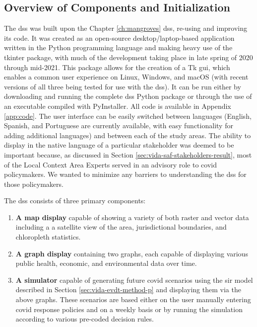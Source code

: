 \subsection{Overview of Components and Initialization}

The \ac{dss} was built upon the Chapter \ref{ch:mangroves} \ac{dss}, re-using and improving its code. It was created as an open-source desktop/laptop-based application written in the Python programming language and making heavy use of the tkinter package, with much of the development taking place in late spring of 2020 through mid-2021. This package allows for the creation of a Tk \ac{gui}, which enables a common user experience on Linux, Windows, and macOS (with recent versions of all three being tested for use with the \ac{dss}). It can be run either by downloading and running the complete \ac{dss} Python package or through the use of an executable compiled with PyInstaller. All code is available in Appendix \ref{app:code}. The user interface can be easily switched between languages (English, Spanish, and Portuguese are currently available, with easy functionality for adding additional languages) and between each of the study areas. The ability to display in the native language of a particular stakeholder was deemed to be important because, as discussed in Section \ref{sec:vida-saf-stakeholders-result}, most of the Local Context Area Experts served in an advisory role to \ac{covid} policymakers. We wanted to minimize any barriers to understanding the \ac{dss} for those policymakers.

The \ac{dss} consists of three primary components:

\begin{enumerate}[label=\emph{\alph*},itemsep=0pt,parsep=0pt]
	\item{\textbf{A map display} capable of showing a variety of both raster and vector data including a a satellite view of the area, jurisdictional boundaries, and chloropleth statistics.}
	\item{\textbf{A graph display} containing two graphs, each capable of displaying various public health, economic, and environmental data over time.}
	\item{\textbf{A simulator} capable of generating future \ac{covid} scenarios using the \ac{sir} model described in Section \ref{sec:vida-evdt-method-p} and displaying them via the above graphs. These scenarios are based either on the user manually entering \ac{covid} response policies and on a weekly basis or by running the simulation according to various pre-coded decision rules.}
\end{enumerate}

